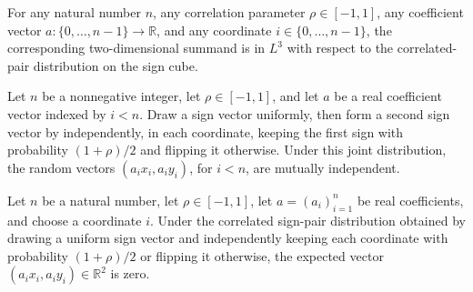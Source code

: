 \begin{theorem}
\label{FABL.regularThresholdPairSummand_memLp}
\leanok
{}
For any natural number $n$, any correlation parameter $\rho\in[-1,1]$, any coefficient
vector $a\colon\{0,\ldots,n-1\}\to\mathbb R$, and any coordinate $i\in\{0,\ldots,n-1\}$,
the corresponding two-dimensional summand is in $L^3$ with respect to the
correlated-pair distribution on the sign cube.
\end{theorem}

\begin{theorem}
\label{FABL.regularThresholdPairSummand_iIndep}
\leanok
{}
Let $n$ be a nonnegative integer, let $\rho\in[-1,1]$, and let $a$ be a real coefficient
vector indexed by $i<n$. Draw a sign vector uniformly, then form a second sign vector by
independently, in each coordinate, keeping the first sign with probability $(1+\rho)/2$
and flipping it otherwise. Under this joint distribution, the random vectors $(a_i
x_i,a_i y_i)$, for $i<n$, are mutually independent.
\end{theorem}

\begin{theorem}
\label{FABL.integral_regularThresholdPairSummand_eq_zero}
\leanok
{}
Let $n$ be a natural number, let $\rho\in[-1,1]$, let $a=(a_i)_{i=1}^n$ be real
coefficients, and choose a coordinate $i$. Under the correlated sign-pair distribution
obtained by drawing a uniform sign vector and independently keeping each coordinate with
probability $(1+\rho)/2$ or flipping it otherwise, the expected vector $(a_i x_i,a_i
y_i)\in\mathbb R^2$ is zero.
\end{theorem}

